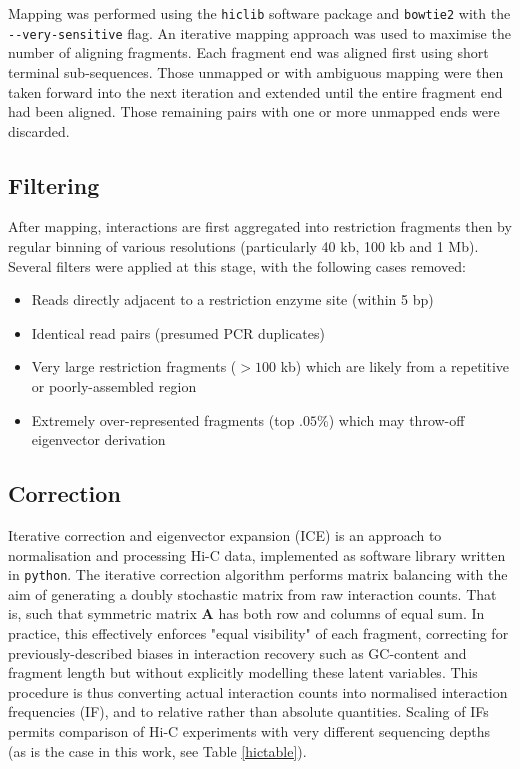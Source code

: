 \documentclass[a4paper,10pt,oneside]{book}
\begin{document}
Mapping was performed using the \texttt{hiclib} software
package\citep{Imakaev2012} and \texttt{bowtie2}\citep{Langmead2012} with
the \texttt{-{}-very-sensitive} flag. An iterative mapping approach was used to maximise the number of aligning fragments.\cite{Imakaev2012} Each fragment end was aligned first using short terminal sub-sequences. Those unmapped or with ambiguous mapping were then taken forward into the next iteration and extended until the entire fragment end had been aligned. Those remaining pairs with one or more unmapped ends were discarded.

\subsection{Filtering}

After mapping, interactions are first aggregated into restriction fragments then by regular binning of various resolutions (particularly 40 kb, 100 kb and 1 Mb). Several filters were applied at this stage, with the following cases removed:\cite{Imakaev2012} 
\begin{itemize}
\item Reads directly adjacent to a restriction enzyme site (within 5 bp)
\item Identical read pairs (presumed PCR duplicates)
\item Very large restriction fragments ($>100$ kb) which are likely from a repetitive or poorly-assembled region
\item Extremely over-represented fragments (top $.05\%$) which may throw-off eigenvector derivation
\end{itemize}

\subsection{Correction}

Iterative correction and eigenvector expansion (ICE) is an approach to normalisation and processing Hi-C data, implemented as software library written in \texttt{python}.\citep{Imakaev2012} The iterative correction algorithm performs matrix balancing with the aim of generating a doubly stochastic matrix from raw interaction counts. That is, such that symmetric matrix $\mathbf{A}$ has both row and columns of equal sum. In practice, this effectively enforces "equal visibility" of each fragment, correcting for previously-described biases in interaction recovery such as GC-content and fragment length\cite{Yaffe2011} but without explicitly modelling these latent variables. This procedure is thus converting actual interaction counts into normalised interaction frequencies (IF), and to relative rather than absolute quantities. Scaling of IFs permits comparison of Hi-C experiments with very different sequencing depths (as is the case in this work, see Table \ref{hictable}).
\end{document}
